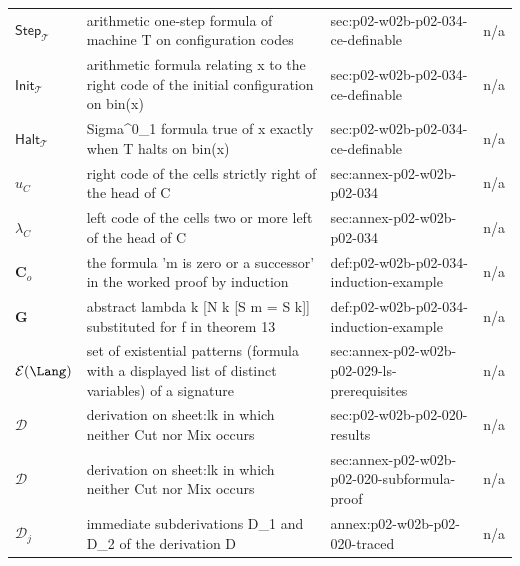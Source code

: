 \begin{longtable}{@{}p{}p{}p{}p{}@{}}
\(\mathsf{Step}_{\mathcal T}\) & arithmetic one-step formula of machine T on configuration codes & sec:\allowbreak{}p02-\allowbreak{}w02b-\allowbreak{}p02-\allowbreak{}034-\allowbreak{}ce-\allowbreak{}definable & n/a \\
\(\mathsf{Init}_{\mathcal T}\) & arithmetic formula relating x to the right code of the initial configuration on bin(x) & sec:\allowbreak{}p02-\allowbreak{}w02b-\allowbreak{}p02-\allowbreak{}034-\allowbreak{}ce-\allowbreak{}definable & n/a \\
\(\mathsf{Halt}_{\mathcal T}\) & Sigma\^{}0\_1 formula true of x exactly when T halts on bin(x) & sec:\allowbreak{}p02-\allowbreak{}w02b-\allowbreak{}p02-\allowbreak{}034-\allowbreak{}ce-\allowbreak{}definable & n/a \\
\(u_C\) & right code of the cells strictly right of the head of C & sec:\allowbreak{}annex-\allowbreak{}p02-\allowbreak{}w02b-\allowbreak{}p02-\allowbreak{}034 & n/a \\
\(\lambda_C\) & left code of the cells two or more left of the head of C & sec:\allowbreak{}annex-\allowbreak{}p02-\allowbreak{}w02b-\allowbreak{}p02-\allowbreak{}034 & n/a \\
\(\mathbf C_o\) & the formula 'm is zero or a successor' in the worked proof by induction & def:\allowbreak{}p02-\allowbreak{}w02b-\allowbreak{}p02-\allowbreak{}034-\allowbreak{}induction-\allowbreak{}example & n/a \\
\(\mathbf G\) & abstract lambda k [N k [S m = S k]] substituted for f in theorem 13 & def:\allowbreak{}p02-\allowbreak{}w02b-\allowbreak{}p02-\allowbreak{}034-\allowbreak{}induction-\allowbreak{}example & n/a \\
\(\mathcal E(\Lang)\) & set of existential patterns (formula with a displayed list of distinct variables) of a signature & sec:\allowbreak{}annex-\allowbreak{}p02-\allowbreak{}w02b-\allowbreak{}p02-\allowbreak{}029-\allowbreak{}ls-\allowbreak{}prerequisites & n/a \\
\(\mathcal D\) & derivation on sheet:lk in which neither Cut nor Mix occurs & sec:\allowbreak{}p02-\allowbreak{}w02b-\allowbreak{}p02-\allowbreak{}020-\allowbreak{}results & n/a \\
\(\mathcal D\) & derivation on sheet:lk in which neither Cut nor Mix occurs & sec:\allowbreak{}annex-\allowbreak{}p02-\allowbreak{}w02b-\allowbreak{}p02-\allowbreak{}020-\allowbreak{}subformula-\allowbreak{}proof & n/a \\
\(\mathcal D_j\) & immediate subderivations D\_1 and D\_2 of the derivation D & annex:\allowbreak{}p02-\allowbreak{}w02b-\allowbreak{}p02-\allowbreak{}020-\allowbreak{}traced & n/a \\

\end{longtable}
